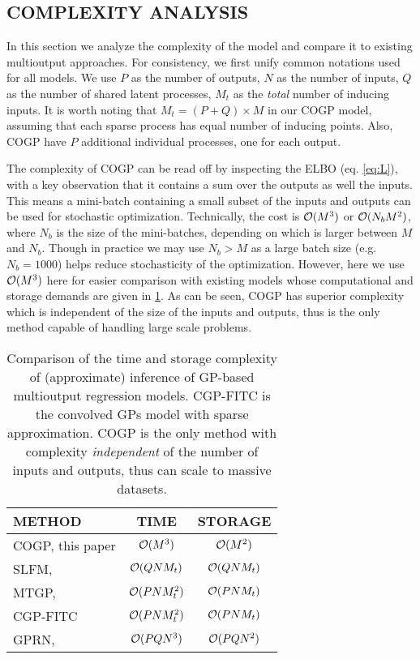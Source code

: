 \subsection{COMPLEXITY ANALYSIS}
In this section we analyze the complexity of the model and compare it to existing multioutput approaches.
For consistency, we first unify common notations used for all models.
We use $P$ as the number of outputs, $N$ as the number of inputs, $Q$ as the number of shared latent processes, $M_t$ as the \emph{total} number of inducing inputs.
It is worth noting that $M_t = (P + Q) \times M$ in our COGP model, assuming that each sparse process has equal number of inducing points. 
Also, COGP have $P$ additional individual processes, one for each output.

The complexity of COGP can be read off by inspecting the ELBO (eq. \ref{eq:L}), with a key observation that it contains a sum over the outputs as well the inputs.
This means a mini-batch containing a small subset of the inputs and outputs can be used for stochastic optimization.
Technically, the cost is $\mathcal{O}(M^3)$ or $\mathcal{O}(N_bM^2)$, where $N_b$ is the size of the mini-batches, depending on which is larger between $M$ and $N_b$. 
Though in practice we may use $N_b > M$ as a large batch size (e.g. $N_b = 1000$) helps reduce stochasticity of the optimization.
However, here we use $\mathcal{O}(M^3)$ here for easier comparison with existing models whose computational and storage demands are given in \ref{tab:complexity}. 
As can be seen, COGP has superior complexity which is independent of the size of the inputs and outputs, thus is the only method capable of handling large scale problems.

\setlength{\tabcolsep}{4pt}
\begin{table}[t]
\caption{Comparison of the time and storage complexity of (approximate) inference of GP-based multioutput regression models. CGP-FITC is the convolved GPs model with sparse approximation\citep{alvarez-lawrence-nips-08}. COGP is the only method with complexity \emph{independent} of the number of inputs and outputs, thus can scale to massive datasets.}
\label{tab:complexity}
\begin{center}
\small
\begin{tabular}{lcc}
\toprule
\textbf{METHOD} & \textbf{TIME} & \textbf{STORAGE} \\ \hline
COGP, this paper  & $\mathcal{O}(M^3)$ & $\mathcal{O}(M^2)$ \\
SLFM, \citep{teh-et-al-aistats-05} & $\mathcal{O}(QNM_t)$ & $\mathcal{O}(QNM_t)$ \\
MTGP, \citep{bonilla-et-al-nips-08} & $\mathcal{O}(PNM_t^2)$ & $\mathcal{O}(PNM_t)$\\ 
CGP-FITC & $\mathcal{O}(PNM_t^2)$ & $\mathcal{O}(PNM_t)$ \\
GPRN, \citep{wilson-et-al-icml-12} & $\mathcal{O}(PQN^3)$ & $\mathcal{O}(PQN^2)$ \\
\bottomrule
\end{tabular}
\end{center}
\end{table}

